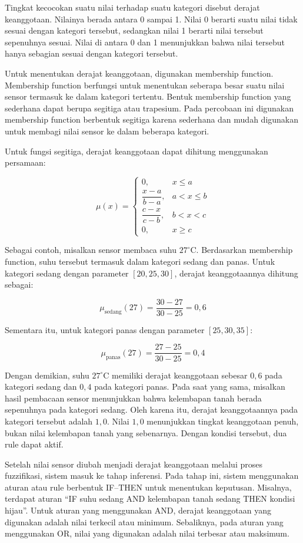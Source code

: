 \documentclass[12pt,a4paper]{article}
\begin{document}
Tingkat kecocokan suatu nilai terhadap suatu kategori disebut derajat keanggotaan. Nilainya berada antara 0 sampai 1. Nilai 0 berarti suatu nilai tidak sesuai dengan kategori tersebut, sedangkan nilai 1 berarti nilai tersebut sepenuhnya sesuai. Nilai di antara 0 dan 1 menunjukkan bahwa nilai tersebut hanya sebagian sesuai dengan kategori tersebut.

Untuk menentukan derajat keanggotaan, digunakan membership function. Membership function berfungsi untuk menentukan seberapa besar suatu nilai sensor termasuk ke dalam kategori tertentu. Bentuk membership function yang sederhana dapat berupa segitiga atau trapesium. Pada percobaan ini digunakan membership function berbentuk segitiga karena sederhana dan mudah digunakan untuk membagi nilai sensor ke dalam beberapa kategori.

Untuk fungsi segitiga, derajat keanggotaan dapat dihitung menggunakan persamaan:

\[
\mu(x)=
\begin{cases}
0, & x\leq a \\
\dfrac{x-a}{b-a}, & a < x \leq b \\
\dfrac{c-x}{c-b}, & b < x < c \\
0, & x\geq c
\end{cases}
\]

Sebagai contoh, misalkan sensor membaca suhu $27^\circ$C. Berdasarkan
membership function, suhu tersebut termasuk dalam kategori sedang dan panas.
Untuk kategori sedang dengan parameter $[20,25,30]$, derajat keanggotaannya
dihitung sebagai:

\[
\mu_{\text{sedang}}(27)
=
\frac{30-27}{30-25}
=
0,6
\]

Sementara itu, untuk kategori panas dengan parameter $[25,30,35]$:

\[
\mu_{\text{panas}}(27)
=
\frac{27-25}{30-25}
=
0,4
\]

Dengan demikian, suhu $27^\circ$C memiliki derajat keanggotaan sebesar $0,6$
pada kategori sedang dan $0,4$ pada kategori panas. Pada saat yang sama,
misalkan hasil pembacaan sensor menunjukkan bahwa kelembapan tanah berada
sepenuhnya pada kategori sedang. Oleh karena itu, derajat keanggotaannya pada
kategori tersebut adalah $1,0$. Nilai $1,0$ menunjukkan tingkat keanggotaan
penuh, bukan nilai kelembapan tanah yang sebenarnya. Dengan kondisi tersebut,
dua rule dapat aktif.

Setelah nilai sensor diubah menjadi derajat keanggotaan melalui proses fuzzifikasi, sistem masuk ke tahap inferensi. Pada tahap ini, sistem menggunakan aturan atau rule berbentuk IF–THEN untuk menentukan keputusan. Misalnya, terdapat aturan “IF suhu sedang AND kelembapan tanah sedang THEN kondisi hijau”. Untuk aturan yang menggunakan AND, derajat keanggotaan yang digunakan adalah nilai terkecil atau minimum. Sebaliknya, pada aturan yang menggunakan OR, nilai yang digunakan adalah nilai terbesar atau maksimum.
\end{document}
